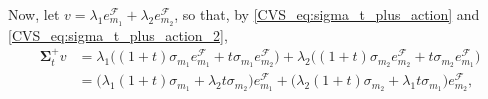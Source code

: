 \documentclass[twoside,11pt]{book}
\numberwithin{theorem}{chapter}
\numberwithin{definition}{chapter}
\numberwithin{proposition}{chapter}
\numberwithin{corollary}{chapter}
\numberwithin{example}{chapter}
\numberwithin{lemma}{chapter}
\numberwithin{assumption}{chapter}
\numberwithin{equation}{chapter}
\numberwithin{figure}{chapter}
\begin{document}
Now, let $v = \lambda_{1} e_{m_{1}}^{\mathcal{F}} + \lambda_{2} e_{m_{2}}^{\mathcal{F}}$, so that, by \eqref{CVS_eq:sigma_t_plus_action} and \eqref{CVS_eq:sigma_t_plus_action_2},
\begin{align}
\bm{\Sigma}_{t}^{+} v & = \lambda_{1} \bigg((1+t) \sigma_{m_{1}} e_{m_{1}}^{\mathcal{F}} + t \sigma_{m_{1}}  e_{m_{2}}^{\mathcal{F}} \bigg) + \lambda_{2} \bigg((1+t) \sigma_{m_{2}} e_{m_{2}}^{\mathcal{F}}  + t \sigma_{m_{2}}  e_{m_{1}}^{\mathcal{F}} \bigg) \nonumber \\
\label{CVS_eq:sigma_t_plus_action_v}
& = \bigg( \lambda_{1} (1+t) \sigma_{m_{1}} + \lambda_{2} t \sigma_{m_{2}} \bigg) e_{m_{1}}^{\mathcal{F}} + \bigg( \lambda_{2} (1+t) \sigma_{m_{2}} + \lambda_{1}t\sigma_{m_{1}} \bigg) e_{m_{2}} ^{\mathcal{F}},
\end{align}
\end{document}
